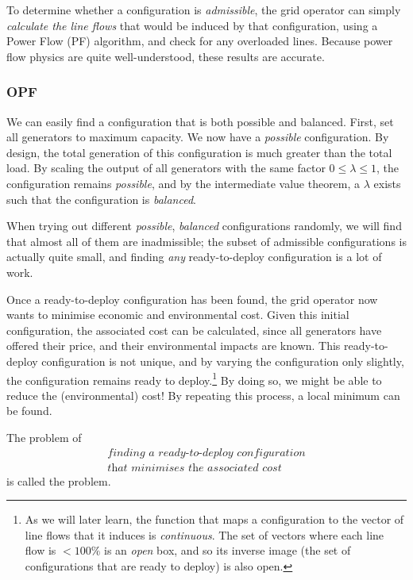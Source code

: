 \documentclass[main.tex]{subfiles}
\begin{document}
To determine whether a configuration is \emph{admissible}, the grid operator can simply \emph{calculate the line flows} that would be induced by that configuration, using a Power Flow (PF) algorithm, and check for any overloaded lines. Because power flow physics are quite well-understood, these results are accurate.



\subsubsection*{OPF}

We can easily find a configuration that is both {possible} and {balanced}. First, set all generators to maximum capacity. We now have a \emph{possible} configuration. By design, the total generation of this configuration is much greater than the total load. By scaling the output of all generators with the same factor $0 \leq \lambda \leq 1$, the configuration remains \emph{possible}, and by the intermediate value theorem, a $\lambda$ exists such that the configuration is \emph{balanced}.


When trying out different \emph{possible}, \emph{balanced} configurations randomly, we will find that almost all of them are inadmissible; the subset of admissible configurations is actually quite small, and finding \emph{any} ready-to-deploy configuration is a lot of work.

Once a {ready-to-deploy} configuration has been found, the grid operator now wants to minimise economic and environmental cost. Given this initial configuration, the associated cost can be calculated, since all generators have offered their price, and their environmental impacts are known. 
This {ready-to-deploy} configuration is not unique, and by varying the configuration only slightly, the configuration remains ready to deploy.\footnote{As we will later learn, the function that maps a configuration to the vector of line flows that it induces is \emph{continuous}. The set of vectors where each line flow is $<100\si{\percent}$ is an \emph{open} box, and so its inverse image (the set of configurations that are ready to deploy) is also open.}
By doing so, we might be able to reduce the (environmental) cost! By repeating this process, a local minimum can be found. 

The problem of
\begin{gather*}
    \textit{finding a ready-to-deploy configuration} \\
    \textit{that minimises the associated cost} \nonumber
\end{gather*}
is called the  problem. 
\end{document}
